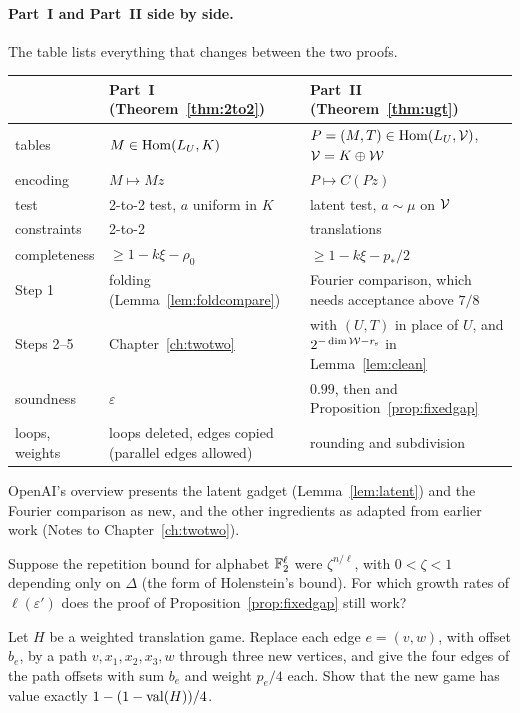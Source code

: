 \paragraph{Part~I and Part~II side by side.} The table lists everything that changes between the two proofs.
\begin{center}\small
\begin{tabular}{@{}p{2.1cm}p{5.6cm}p{7.4cm}@{}}
 & Part~I (Theorem~\ref{thm:2to2}) & Part~II (Theorem~\ref{thm:ugt})\\\hline
tables & $M\in\operatorname{Hom}(L_U,K)$ & $P=(M,T)\in\operatorname{Hom}(L_U,\mathcal{V})$, $\mathcal{V}=K\oplus\mathcal{W}$\\
encoding & $M\mapsto Mz$ & $P\mapsto C(Pz)$\\
test & 2-to-2 test, $a$ uniform in $K$ & latent test, $a\sim\mu$ on $\mathcal{V}$\\
constraints & 2-to-2 & translations\\
completeness & $\ge1-k\xi-\rho_0$ & $\ge1-k\xi-p_*/2$\\
Step 1 & folding (Lemma~\ref{lem:foldcompare}) & Fourier comparison, which needs acceptance above $7/8$\\
Steps 2--5 & Chapter~\ref{ch:twotwo} & with $(U,T)$ in place of $U$, and $2^{-\dim\mathcal{W}-r_{\mathrm s}}$ in Lemma~\ref{lem:clean}\\
soundness & $\varepsilon$ & $0.99$, then \cite[Lemma~7.1]{OAI} and Proposition~\ref{prop:fixedgap}\\
loops, weights & loops deleted, edges copied (parallel edges allowed) & rounding and subdivision\\
\end{tabular}
\end{center}

\chapternotes
OpenAI's overview \cite[Section~1.4]{OAI} presents the latent gadget (Lemma~\ref{lem:latent}) and the Fourier comparison as new, and the other ingredients as adapted from earlier work (Notes to Chapter~\ref{ch:twotwo}).

\chapterquestions
\begin{question}\label{q:holenstein}
Suppose the repetition bound for alphabet $\mathbb{F}_2^\ell$ were $\zeta^{n/\ell}$, with $0<\zeta<1$ depending only on $\Delta$ (the form of Holenstein's bound). For which growth rates of $\ell(\varepsilon')$ does the proof of Proposition~\ref{prop:fixedgap} still work?
\end{question}

\begin{question}\label{q:subdivision}
Let $H$ be a weighted translation game. Replace each edge $e=(v,w)$, with offset $b_e$, by a path $v,x_1,x_2,x_3,w$ through three new vertices, and give the four edges of the path offsets with sum $b_e$ and weight $p_e/4$ each. Show that the new game has value exactly $1-(1-\operatorname{val}(H))/4$.
\end{question}
